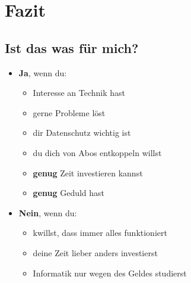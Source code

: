 \documentclass[
    ngerman,
    accentcolor=3b,
    fontsize= 12pt,
    a4paper,
    aspectratio=169,
    colorback=true,
    fancy_row_colors,
    leqno,
    fleqn,
    boxarc=3pt,
    fleqn,
    main,
    design=2008,
]{algoslides}
\begin{document}
    \section{Fazit}\label{2}\label{Fazit}
    \subsection{Ist das was für mich?}
    \begin{frame}
        \slidehead{}
        \begin{itemize}
            \item \textbf{Ja}, wenn du:\begin{itemize}
                    \item Interesse an Technik hast
                    \item gerne Probleme löst
                    \item dir Datenschutz wichtig ist
                    \item du dich von Abos entkoppeln willst
                    \item \textbf{genug} Zeit investieren kannst
                    \item \textbf{genug} Geduld hast
                \end{itemize}
            \item \textbf{Nein}, wenn du:\begin{itemize}
                    \item kwillst, dass immer alles funktioniert
                    \item deine Zeit lieber anders investierst
                    \item Informatik nur wegen des Geldes studierst
                \end{itemize}
        \end{itemize}
    \end{frame}
\end{document}
